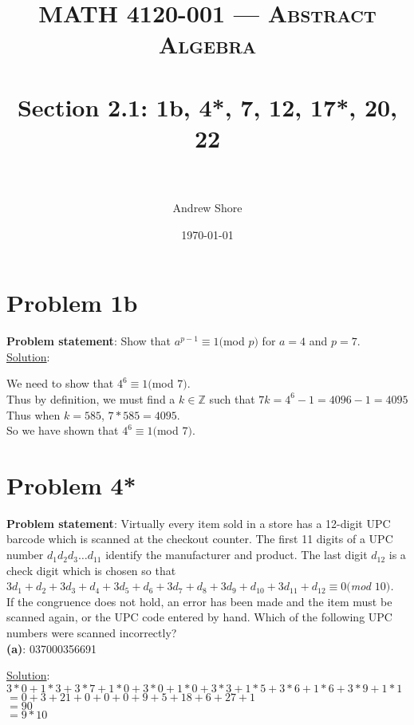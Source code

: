 \documentclass{article} %
\title{ 
\normalfont \normalsize 
\textsc{MATH 4120-001 --- Abstract Algebra} \\
\horrule{0.5pt} \\[0cm] %
\huge Section 2.1: 1b, 4*, 7, 12, 17*, 20, 22  \\ %
\horrule{2pt} \\[0cm] %
}
\author{Andrew Shore} %
\date{\normalsize\today} %
\begin{document}
\maketitle %

\section*{Problem 1b}


\textbf{Problem statement}: Show that $a^{p-1} \equiv 1 ($mod $p)$ for $a = 4$ and $p = 7$.
\\

\underline{Solution}: 
\begin{addmargin}[1em]{0em}
We need to show that $4^6 \equiv 1 ($mod $7)$.
\\Thus by definition, we must find a $k \in \mathbb{Z}$ such that $7k = 4^6 - 1 = 4096 - 1 = 4095$
\\Thus when $k = 585$, $7 * 585 = 4095$.
\\So we have shown that $4^6 \equiv 1($mod $7)$.
\end{addmargin}    

\newpage

\section*{Problem 4*}

\textbf{Problem statement}: Virtually every item sold in a store has a 12-digit UPC barcode which is scanned at the checkout counter.  The first 11 digits of a UPC number $d_1d_2d_3 \ldots d_{11}$ identify the manufacturer and product.  The last digit $d_{12}$ is a check digit which is chosen so that 
\\ \hfill \break
\textit{$3d_1 + d_2 + 3d_3 + d_4 + 3d_5 + d_6 + 3d_7 + d_8 + 3d_9 + d_{10} + 3d_{11} + d_{12} \equiv 0 ($mod $ 10)$.}
\\ \hfill \break
If the congruence does not hold, an error has been made and the item must be scanned again, or the UPC code entered by hand.  Which of the following UPC numbers were scanned incorrectly?
\\

\textbf{(a)}: 037000356691
\\
\begin{addmargin}[1em]{0em}
\underline{Solution}: 
$3 * 0 + 1 * 3 + 3 * 7 + 1 * 0 + 3 * 0 + 1 * 0 + 3 * 3 + 1 * 5 + 3 * 6 + 1 * 6 + 3 * 9 + 1 * 1$
\\$= 0 + 3 + 21 + 0 + 0 + 0 + 9 + 5 + 18 + 6 + 27 + 1$
\\$= 90$
\\$= 9 * 10$ \checkmark
\begin{addmargin}[1em]{0em}

\end{addmargin}
\begin{addmargin}[1em]{0em}
\end{addmargin}
\end{addmargin}
\end{document}
